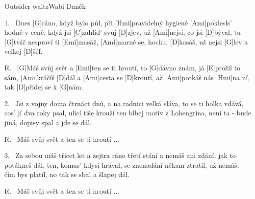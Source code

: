 \begin{song}{Outsider waltz}{Wabi Daněk}

\begin{xverse}{1.~}
Dnes [\large G]ráno, když bylo půl, při [\large Hmi]pravidelný hygieně
[\large Ami]poklesls' hodně v ceně, když jsi [\large C]zahlíd' svůj [\large D]zjev,
už [\large Ami]nejsi, co jsi [\large D]býval, tu [\large G]tvář nespraví ti [\large Emi]masáž,
[\large Ami]marně se, hochu, [\large D]kasáš, už nejsi [\large G]lev a velkej [\large D]{}šéf.
\end{xverse}

\begin{xverse}{R.~}
[\large G]Máš svůj svět a [\large Emi]ten se ti hroutí,
to [\large G]dávno znám, já [\large E]prožil to sám,
[\large Ami]kráčíš [\large D]dál a [\large Ami]cesta se [\large D]kroutí,
až [\large Ami]potkáš nás [\large Hmi]na ní, tak   [\large D]přidej se k [\large G]nám.
\end{xverse}

\begin{xverse}{2.~}
Jsi z vojny doma čtrnáct dnů, a na radnici velká sláva,
to se ti holka vdává, cos' jí dva roky psal,
ulicí tiše krouží ten blbej motiv z Lohengrina,
není ta - bude jiná, dopisy spal a jde se dál.
\end{xverse}

\begin{xverse}{R.~}
Máš svůj svět a ten se ti hroutí ...
\end{xverse}

\begin{xverse}{3.~}
Za sebou máš třicet let a zejtra ráno třetí stání
a nemáš ani zdání, jak to potáhneš dál,
ten, komus' kdysi hrával, se znenadání někam ztratil,
už nemáš, čím bys platil, no tak se sbal a šlapej dál.
\end{xverse}

\begin{xverse}{R.~}
Máš svůj svět a ten se ti hroutí ...
\end{xverse}

\end{song}

